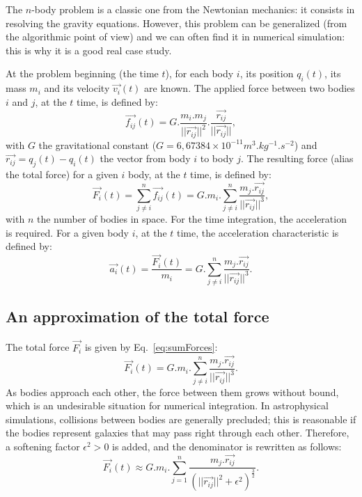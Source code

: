 The $n$-body problem is a classic one from the Newtonian mechanics: it consists in resolving the gravity equations.
However, this problem can be generalized (from the algorithmic point of view) and we can often find it in numerical simulation: this is why it is a good real case study.

At the problem beginning (the time $t$), for each body $i$, its position $q_{i}(t)$, its mass $m_i$ and its velocity $\vec{v_i}(t)$ are known.
The applied force between two bodies $i$ and $j$, at the $t$ time, is defined by:
\begin{equation}
\label{eq:force}
	\vec{f_{ij}}(t) = G.\frac{m_i.m_j}{||\vec{r_{ij}}||^2}.\frac{\vec{r_{ij}}}{||\vec{r_{ij}}||},
\end{equation}
with $G$ the gravitational constant ($G = 6,67384\times10^{-11} m^3.kg^{-1}.s^{-2}$) and $\vec{r_{ij}} = q_j(t) - q_i(t)$ the vector from body $i$ to body $j$.
The resulting force (alias the total force) for a given $i$ body, at the $t$ time, is defined by:
\begin{equation}
\label{eq:sumForces}
	\vec{F_i}(t) = \sum_{j \ne i}^{n} \vec{f_{ij}}(t) = G.m_i.\sum_{j \ne i}^{n}\frac{m_j.\vec{r_{ij}}}{||\vec{r_{ij}}||^3},
\end{equation}
with $n$ the number of bodies in space.
For the time integration, the acceleration is required. For a given body $i$, at the $t$ time, the acceleration characteristic is defined by:
\begin{equation}
\label{eq:acceleration}
	\vec{a_i}(t) = \frac{\vec{F_i}(t)}{m_i} = G.\sum_{j \ne i}^{n}\frac{m_j.\vec{r_{ij}}}{||\vec{r_{ij}}||^3}.
\end{equation}

\subsection{An approximation of the total force}

The total force $\vec{F_i}$ is given by Eq.~\ref{eq:sumForces}:
\begin{equation*}
	\vec{F_i}(t) = G.m_i.\sum_{j \ne i}^{n}\frac{m_j.\vec{r_{ij}}}{||\vec{r_{ij}}||^3}.
\end{equation*}
As bodies approach each other, the force between them grows without bound, which is an undesirable situation for numerical integration. 
In astrophysical simulations, collisions between bodies are generally precluded; this is reasonable if the bodies represent galaxies that may pass right through each other. 
Therefore, a softening factor $\epsilon^2 > 0$ is added, and the denominator is rewritten as follows:
\begin{equation}
\label{eq:sumForcesSoft}
	\vec{F_i}(t) \approx G.m_i.\sum_{j = 1}^{n}\frac{m_j.\vec{r_{ij}}}{(||\vec{r_{ij}}||^2 + \epsilon^2)^\frac{3}{2}}.
\end{equation}

